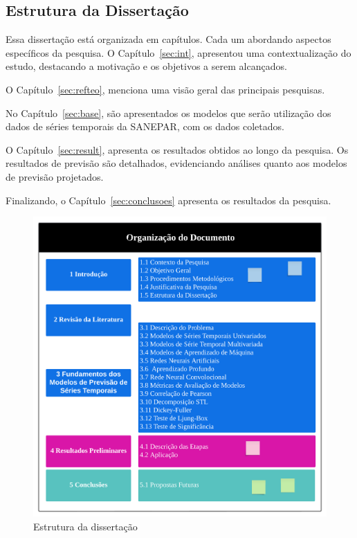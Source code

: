 \subsection{Estrutura da Disserta\c c\~ao} \label{subsec:estrutura}


Essa dissertação está organizada em capítulos. Cada um abordando aspectos específicos da pesquisa. 
O Capítulo~\ref{sec:int},  apresentou uma contextualização do estudo, destacando a motivação e os objetivos a serem alcançados. 

O Capítulo~\ref{sec:refteo}, menciona uma visão geral das principais pesquisas.

No Capítulo~\ref{sec:base}, são apresentados os modelos que serão utilização dos dados de séries temporais da SANEPAR, com os dados coletados.


O Capítulo~\ref{sec:result}, apresenta os resultados obtidos ao longo da pesquisa.  Os resultados de previsão são detalhados, evidenciando análises quanto aos modelos de previsão projetados.

Finalizando, o Capítulo~\ref{sec:conclusoes} apresenta os resultados da pesquisa.


 
 \begin{figure}[!htb]
 	\centering
 	\caption{Estrutura da dissertação}
 	\label{fig:estrutura}
 	\includegraphics[width=0.75\linewidth]{Introducao/Figuras/estrutura}
 	
 	 
 \end{figure}



